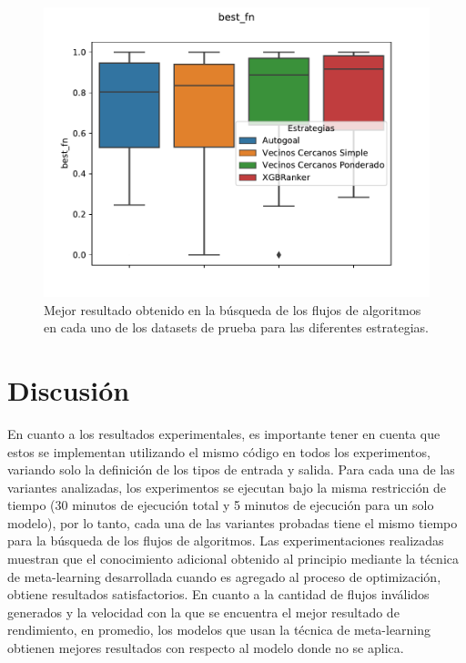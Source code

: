 \begin{figure}[H]
\centering
\includegraphics[scale=.75]{Figures/best-fn.pdf}
\caption{Mejor resultado obtenido en la búsqueda de los flujos de algoritmos en cada uno de los datasets de prueba para las diferentes estrategias.}
\label{fig:bestfn}
\end{figure}

\section{Discusión}\label{sec:discusion}

%
%
%	
%	
%	

En cuanto a los resultados experimentales, es importante tener en cuenta que estos se implementan utilizando el mismo código en todos los experimentos, variando solo la definición de los tipos de entrada y salida. Para cada una de las variantes analizadas, los experimentos se ejecutan bajo la misma restricción de tiempo (30 minutos de ejecución total y 5 minutos de ejecución para un solo modelo), por lo tanto, cada una de las variantes probadas tiene el mismo tiempo para la búsqueda de los flujos de algoritmos. Las experimentaciones realizadas muestran que el conocimiento adicional obtenido al principio mediante la técnica de meta-learning desarrollada cuando es agregado al proceso de optimización, obtiene resultados satisfactorios. En cuanto a la cantidad de flujos inválidos generados y la velocidad con la que se encuentra el mejor resultado de rendimiento, en promedio, los modelos que usan la técnica de meta-learning obtienen mejores resultados con respecto al modelo donde no se aplica.

